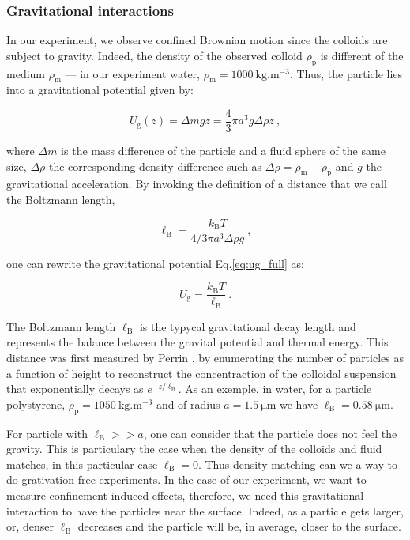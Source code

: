 \subsubsection{Gravitational interactions}


In our experiment, we observe confined Brownian motion since the colloids are subject to gravity. Indeed, the density of the observed colloid $\rho_\mathrm{p}$ is different of the medium $\rho_\mathrm{m}$ --- in our experiment water, $\rho_\mathrm{m} = 1000 ~ \mathrm{kg.m^{-3}}$. Thus, the particle lies into a gravitational potential given by:

\begin{equation}
	U_\mathrm{g} (z) = \Delta m g z = \frac{4}{3}\pi a ^3 g \Delta \rho z ~,
	\label{eq:ug_full}
\end{equation}

where $\Delta m$ is the mass difference of the particle and a fluid sphere of the same size, $\Delta \rho$ the corresponding density difference such as $\Delta \rho = \rho_\mathrm{m} - \rho_\mathrm{p} $ and $g$ the gravitational acceleration. By invoking the definition of a distance that we call the Boltzmann length,

\begin{equation}
	\ell _\mathrm{B} = \frac{k_\mathrm{B}T}{4/3 \pi a ^3 \Delta \rho g } ~,
\end{equation}

one can rewrite the gravitational potential Eq.\ref{eq:ug_full} as:

\begin{equation}
	U_\mathrm{g} = \frac{k_\mathrm{B}T}{\ell _\mathrm{B}} ~.
	\label{eq:ug}
\end{equation}

The Boltzmann length $\ell_\mathrm{B}$ is the typycal gravitational decay length and represents the balance between the gravital potential and thermal energy. This distance was first measured by Perrin \cite{perrin_les_2014}, by enumerating the number of particles as a function of height to reconstruct the concentraction of the colloidal suspension that exponentially decays as $e^{- z / \ell _\mathrm{B}}$. As an exemple, in water, for a particle polystyrene, $\rho _\mathrm{p} = 1050 ~ \mathrm{kg.m^{-3}}$ and of radius $a  = 1.5 ~ \mathrm{\mu m}$ we have $\ell _\mathrm{B} = 0.58 ~ \mathrm{\mu m}$.

For particle with $\ell _\mathrm{B} >> a $, one can consider that the particle does not feel the gravity. This is particulary the case when the density of the colloids and fluid matches, in this particular case $\ell _\mathrm{B} = 0$. Thus density matching can we a way to do grativation free experiments. In the case of our experiment, we want to measure confinement induced effects, therefore, we need this gravitational interaction to have the particles near the surface. Indeed, as a particle gets larger, or, denser $\ell _\mathrm{B}$ decreases and the particle will be, in average, closer to the surface. 


